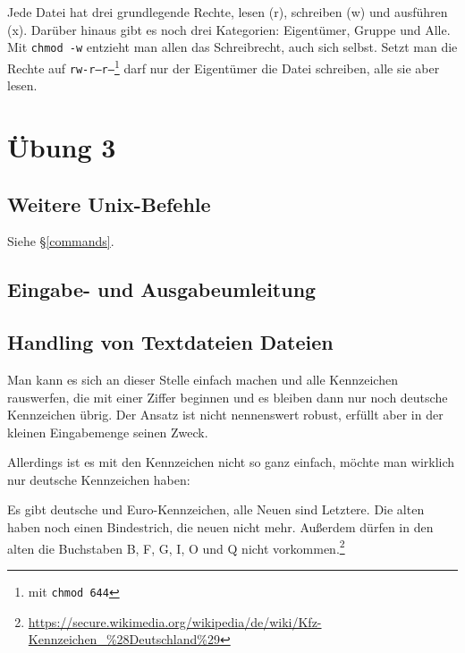 \documentclass[12pt]{report}
\begin{document}
Jede Datei hat drei grundlegende Rechte, lesen (r), schreiben (w) und ausführen (x). Darüber hinaus gibt es noch drei Kategorien: Eigentümer, Gruppe und Alle. Mit \texttt{chmod -w} entzieht man allen das Schreibrecht, auch sich selbst. Setzt man die Rechte auf \texttt{rw-r--r--}\footnote{mit \texttt{chmod 644}} darf nur der Eigentümer die Datei schreiben, alle sie aber lesen.

\chapter{Übung 3}

\section{Weitere Unix-Befehle}

Siehe §\ref{commands}.

\section{Eingabe- und Ausgabeumleitung}



\section{Handling von Textdateien Dateien}

Man kann es sich an dieser Stelle einfach machen und alle Kennzeichen rauswerfen, die mit einer Ziffer beginnen und es bleiben dann nur noch deutsche Kennzeichen übrig. Der Ansatz ist nicht nennenswert robust, erfüllt aber in der kleinen Eingabemenge seinen Zweck.





Allerdings ist es mit den Kennzeichen nicht so ganz einfach, möchte man wirklich nur deutsche Kennzeichen haben:

Es gibt deutsche und Euro-Kennzeichen, alle Neuen sind Letztere. Die alten haben noch einen Bindestrich, die neuen nicht mehr. Außerdem dürfen in den alten die Buchstaben B, F, G, I, O und Q nicht vorkommen.\footnote{\url{https://secure.wikimedia.org/wikipedia/de/wiki/Kfz-Kennzeichen_\%28Deutschland\%29}}
\end{document}

